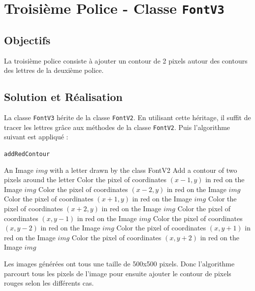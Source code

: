 \documentclass[a4paper, 12pt]{article}
\begin{document}
\newpage
\section{Troisième Police - Classe \texttt{FontV3}}		
\subsection{Objectifs}
La troisième police consiste à ajouter un contour de 2 pixels autour des contours des lettres de la deuxième police. 

\subsection{Solution et Réalisation}
La classe \texttt{FontV3} hérite de la classe \texttt{FontV2}. En utilisant cette héritage, il suffit de tracer les lettres grâce aux méthodes de la classe \texttt{FontV2}. Puis l'algorithme suivant est appliqué :   

\begin{algorithm}
	\caption{\texttt{addRedContour}}
		\begin{algorithmic}[1]
		\Require An Image $img$ with a letter drawn by the class FontV2
		\Ensure Add a contour of two pixels around the letter
						\State Color the pixel of coordinates $(x-1, y)$ in red on the Image $img$
						\State Color the pixel of coordinates $(x-2, y)$ in red on the Image $img$
						\EndIf
						\State Color the pixel of coordinates $(x+1, y)$ in red on the Image $img$
						\State Color the pixel of coordinates $(x+2, y)$ in red on the Image $img$
					\EndIf
						\State Color the pixel of coordinates $(x, y-1)$ in red on the Image $img$
						\State Color the pixel of coordinates $(x, y-2)$ in red on the Image $img$
					\EndIf
						\State Color the pixel of coordinates $(x, y+1)$ in red on the Image $img$
						\State Color the pixel of coordinates $(x, y+2)$ in red on the Image $img$ 
					\EndIf	
				\EndIf	
			\EndFor
		\EndFor
		\EndFunction
		\end{algorithmic}
\end{algorithm}

Les images générées ont tous une taille de 500x500 pixels. Donc l'algorithme parcourt tous les pixels de l'image pour ensuite ajouter le contour de pixels rouges selon les différents cas.
\end{document}
